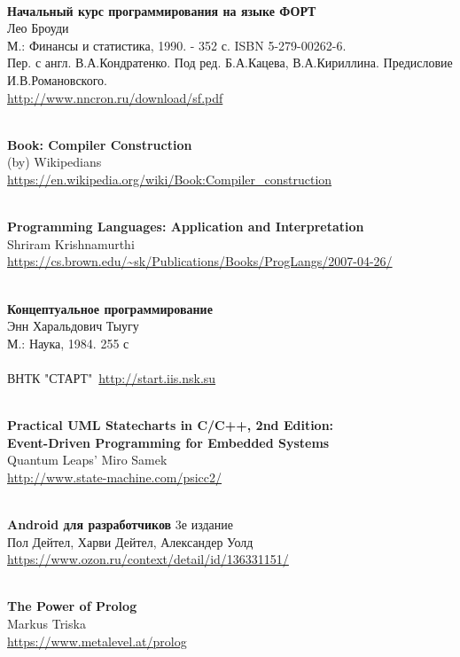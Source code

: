 \begin{thebibliography}{99}
\clearpage
{}\ \\
\textbf{Начальный курс программирования на языке ФОРТ}\\
Лео Броуди \\
М.: Финансы и статистика, 1990. - 352 с.  ISBN 5-279-00262-6.\\
Пер. с англ. В.А.Кондратенко. Под ред. Б.А.Кацева, В.А.Кириллина. Предисловие
И.В.Романовского.\\
\url{http://www.nncron.ru/download/sf.pdf}

\clearpage
{}\ \\
\textbf{Book: Compiler Construction}\\
(by) Wikipedians\\
\url{https://en.wikipedia.org/wiki/Book:Compiler_construction}

\clearpage
{}\ \\
\textbf{Programming Languages: Application and Interpretation}\\
Shriram Krishnamurthi\\
\url{https://cs.brown.edu/~sk/Publications/Books/ProgLangs/2007-04-26/}

\clearpage
{}\ \\
\textbf{Концептуальное программирование}\\
Энн Харальдович Тыугу\\
М.: Наука, 1984. 255 с\\
\ \\
ВНТК "СТАРТ"\ \url{http://start.iis.nsk.su}

\clearpage
{}\ \\
\textbf{Practical UML Statecharts in C/C++, 2nd Edition:\\
Event-Driven Programming for Embedded Systems}\\
Quantum Leaps' Miro Samek\\
\url{http://www.state-machine.com/psicc2/}

\clearpage
{}\ \\
\textbf{Android для разработчиков} 3е издание\\
Пол Дейтел, Харви Дейтел, Александер Уолд\\
\url{https://www.ozon.ru/context/detail/id/136331151/}

\clearpage
{}\ \\
\textbf{The Power of Prolog}\\
Markus Triska\\
\url{https://www.metalevel.at/prolog}

\end{thebibliography}
